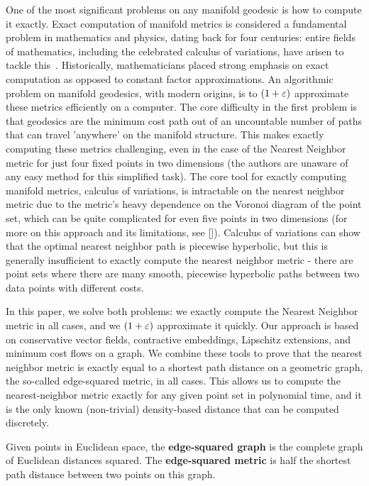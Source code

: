 One of the most significant problems on any manifold geodesic is how to
compute it exactly. Exact computation of manifold metrics is considered a
fundamental problem in mathematics and physics, dating back for four
centuries: entire fields of mathematics, including the celebrated calculus
of variations, have arisen to tackle this~\cite{}. Historically,
mathematicians placed strong emphasis on exact computation as opposed to
constant factor approximations. An algorithmic problem on manifold
geodesics, with modern origins, is to $(1+\varepsilon)$ approximate these metrics
efficiently on a computer. The core difficulty in the first problem is that
geodesics are the minimum cost path out of an uncountable number of paths
that can travel 'anywhere' on the manifold structure. This makes exactly
computing these metrics challenging, even in the case of the Nearest
Neighbor metric for just four fixed points in two dimensions (the authors
are unaware of any easy method for this simplified task). 
The core tool for exactly
computing manifold metrics, calculus of variations, is intractable on the
nearest neighbor metric due to the metric's heavy dependence on the Voronoi
diagram of the point set, which can be quite complicated for even five
points in two dimensions (for more on this approach and its limitations,
see []). Calculus of variations can show that the optimal nearest neighbor
path is piecewise hyperbolic, but this is generally insufficient to exactly
compute the nearest neighbor metric - there are point sets where there are
many smooth, piecewise hyperbolic paths between two data points with
different costs.


In this paper, we solve both problems: we exactly compute the Nearest
Neighbor metric in all cases, and we $(1+\varepsilon)$ approximate it quickly.
Our approach is
based on conservative vector fields, contractive embeddings, Lipschitz
extensions, and minimum cost
flows on a graph. We combine these tools to prove that the nearest neighbor
metric is exactly equal to a shortest path distance on a geometric graph,
the so-called edge-squared metric, in all cases. This allows us to compute
the nearest-neighbor metric exactly for any given point set in polynomial
time, and it is the only known (non-trivial) density-based distance that can be computed
discretely.


\begin{definition} Given points in Euclidean space, the
\textbf{edge-squared graph} is the complete graph of Euclidean distances
squared. The \textbf{edge-squared metric} is half the shortest path distance
between two points on this graph. \end{definition}

